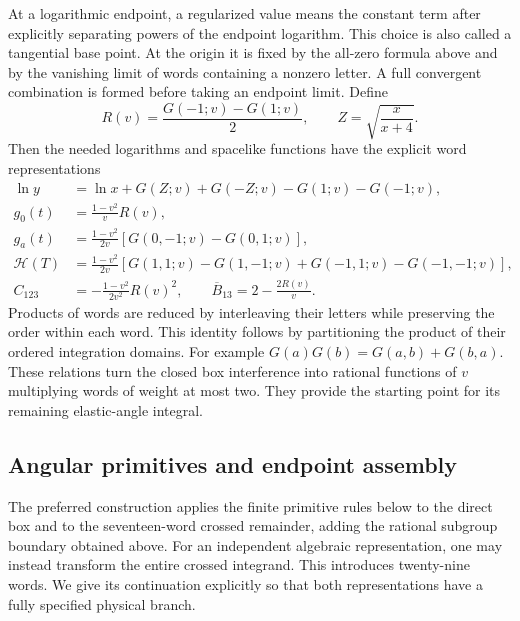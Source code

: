 At a logarithmic endpoint, a regularized value means the constant
term after explicitly separating powers of the endpoint logarithm.
This choice is also called a tangential base point. At the origin
it is fixed by the all-zero formula above and by the vanishing limit
of words containing a nonzero letter. A full convergent combination
is formed before taking an endpoint limit. Define
\begin{equation}
 R(v)=\frac{G(-1;v)-G(1;v)}2,
 \qquad Z=\sqrt{\frac{x}{x+4}}.
\end{equation}
Then the needed logarithms and spacelike functions have the
explicit word representations
\begin{align}
 \ln y&=\ln x+G(Z;v)+G(-Z;v)-G(1;v)-G(-1;v),\\
 g_0(t)&=\frac{1-v^2}{v}R(v),\\
 g_a(t)&=\frac{1-v^2}{2v}\left[G(0,-1;v)-G(0,1;v)\right],\\
 \mathcal H(T)&=\frac{1-v^2}{2v}
 \left[G(1,1;v)-G(1,-1;v)+G(-1,1;v)-G(-1,-1;v)\right],\\
 C_{123}&=-\frac{1-v^2}{2v^2}R(v)^2,\qquad
 \overline B_{13}=2-\frac{2R(v)}v.
\end{align}
Products of words are reduced by interleaving their letters while
preserving the order within each word. This identity follows by
partitioning the product of their ordered integration domains.
For example $G(a)G(b)=G(a,b)+G(b,a)$.
These relations turn the closed box interference into rational
functions of $v$ multiplying words of weight at most two. They
provide the starting point for its remaining elastic-angle integral.



\subsection{Angular primitives and endpoint assembly}
The preferred construction applies the finite primitive rules below to
the direct box and to the seventeen-word crossed remainder, adding the
rational subgroup boundary obtained above. For an independent algebraic
representation, one may instead transform the entire crossed integrand.
This introduces twenty-nine words. We give its continuation explicitly
so that both representations have a fully specified physical branch.

